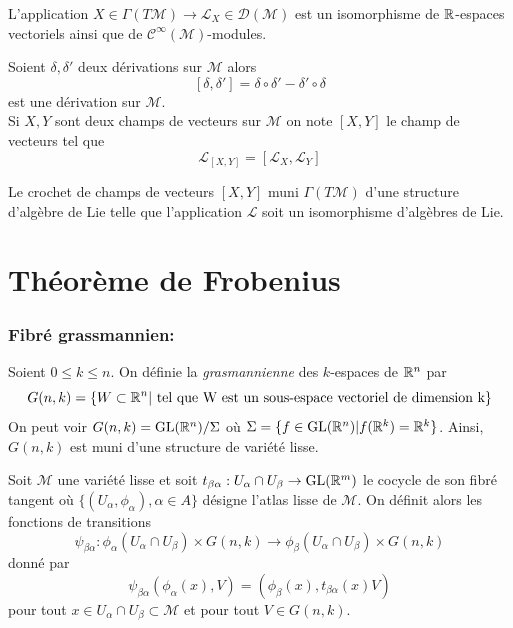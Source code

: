\documentclass[12pt, a4paper]{book}
\begin{document}
\begin{pro}
L'application $X \in \Gamma(T\mathcal{M}) \to \mathscr{L}_X \in \mathscr{D}(\mathcal{M})$ est un isomorphisme de $\mathbb{R}$-espaces vectoriels ainsi que de $\mathscr{C}^\infty(\mathcal{M})$-modules.
\end{pro}

\begin{defi}
Soient $\delta, \delta'$ deux dérivations sur $\mathcal{M}$ alors
$$[\delta, \delta'] = \delta \circ \delta' - \delta' \circ \delta$$
est une dérivation sur $\mathcal{M}$. \\

Si $X, Y$ sont deux champs de vecteurs sur $\mathcal{M}$ on note $[X, Y]$ le champ de vecteurs tel que 
$$\mathscr{L}_{[X, Y]} = [\mathscr{L}_X, \mathscr{L}_Y]$$
\end{defi}

\begin{pro}
Le crochet de champs de vecteurs $[X, Y]$ muni $\Gamma(T\mathcal{M})$ d'une structure d'algèbre de Lie telle que l'application $\mathscr{L}$ soit un isomorphisme d'algèbres de Lie.
\end{pro}

\newpage
\section{Théorème de Frobenius}

\subsubsection{Fibré grassmannien:}

\begin{defi}[Grasmannienne]
Soient $0\leq k \leq n$. On définie la \emph{grasmannienne} des $k$-espaces de $\mathbb{R}^n$ par 
$$G(n,k) = \{ W \subset \mathbb{R}^n | \text{ tel que W est un sous-espace vectoriel de dimension k}\}$$ 
On peut voir $G(n,k) = \operatorname{GL}(\mathbb{R}^n) / \Sigma$ où $\Sigma = \{f\in \operatorname{GL}(\mathbb{R}^n) | f(\mathbb{R}^k) = \mathbb{R}^k\}$. Ainsi, $G(n,k)$ est muni d'une structure de variété lisse. \\
\end{defi} 

Soit $\mathcal{M}$ une variété lisse et soit $t_{\beta\alpha} : U_\alpha \cap U_\beta \to \operatorname{GL}(\mathbb{R}^m)$ le cocycle de son fibré tangent où $\{(U_\alpha, \phi_\alpha), \alpha \in A\}$ désigne l'atlas lisse de $\mathcal{M}$. On définit alors les fonctions de transitions 
$$\psi_{\beta\alpha} : \phi_\alpha(U_\alpha\cap U_\beta) \times G(n, k) \to \phi_\beta(U_\alpha \cap U_\beta) \times G(n,k)$$
donné par 
$$\psi_{\beta\alpha}(\phi_\alpha(x), V) = (\phi_\beta(x) , t_{\beta\alpha}(x)V)$$
pour tout $x\in U_\alpha \cap U_\beta \subset \mathcal{M}$ et pour tout $V\in G(n,k)$. \\
\end{document}
